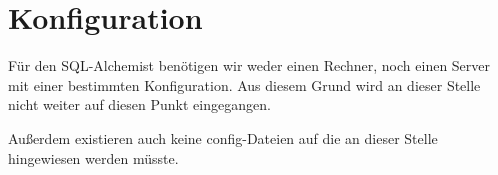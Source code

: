 
\chapter{Konfiguration}
Für den SQL-Alchemist benötigen wir weder einen Rechner, noch einen Server mit einer bestimmten Konfiguration. Aus diesem Grund wird an dieser Stelle nicht weiter auf diesen Punkt eingegangen.

Außerdem existieren auch keine config-Dateien auf die an dieser Stelle hingewiesen werden müsste.

